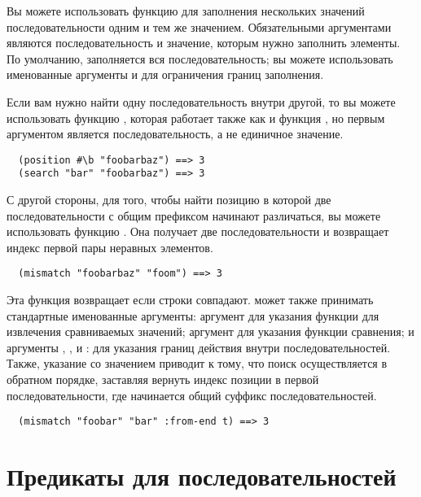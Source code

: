Вы можете использовать функцию  для заполнения нескольких значений
последовательности одним и тем же значением.  Обязательными аргументами являются
последовательность и значение, которым нужно заполнить элементы.  По умолчанию,
заполняется вся последовательность; вы можете использовать именованные аргументы
 и  для ограничения границ заполнения.

Если вам нужно найти одну последовательность внутри другой, то вы можете использовать
функцию , которая работает также как и функция , но первым
аргументом является последовательность, а не единичное значение.

\begin{verbatim}
  (position #\b "foobarbaz") ==> 3
  (search "bar" "foobarbaz") ==> 3
\end{verbatim}

С другой стороны, для того, чтобы найти позицию в которой две последовательности с общим
префиксом начинают различаться, вы можете использовать функцию .  Она
получает две последовательности и возвращает индекс первой пары неравных элементов.

\begin{verbatim}
  (mismatch "foobarbaz" "foom") ==> 3
\end{verbatim}

Эта функция возвращает  если строки совпадают.  может также
принимать стандартные именованные аргументы: аргумент  для указания функции для
извлечения сравниваемых значений; аргумент  для указания функции сравнения; и
аргументы , ,  и : для указания границ
действия внутри последовательностей.  Также, указание  со значением
 приводит к тому, что поиск осуществляется в обратном порядке, заставляя
 вернуть индекс позиции в первой последовательности, где начинается общий
суффикс последовательностей.

\begin{verbatim}
  (mismatch "foobar" "bar" :from-end t) ==> 3
\end{verbatim}

\section{Предикаты для последовательностей}

